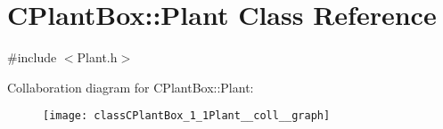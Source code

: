 \hypertarget{classCPlantBox_1_1Plant}{}\section{C\+Plant\+Box\+:\+:Plant Class Reference}
\label{classCPlantBox_1_1Plant}


{\ttfamily \#include $<$Plant.\+h$>$}



Collaboration diagram for C\+Plant\+Box\+:\+:Plant\+:\nopagebreak
\begin{figure}[H]
\begin{center}
\leavevmode
\texttt{[image: classCPlantBox\_1\_1Plant\_\_coll\_\_graph]}
\end{center}
\end{figure}
